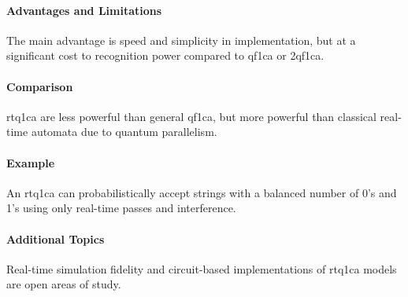 \paragraph{Advantages and Limitations}
The main advantage is speed and simplicity in implementation, but at a significant cost to recognition power compared to \gls{qf1ca} or \gls{2qf1ca}.

\paragraph{Comparison}
\gls{rtq1ca} are less powerful than general \gls{qf1ca}, but more powerful than classical real-time automata due to quantum parallelism.

\paragraph{Example}
An \gls{rtq1ca} can probabilistically accept strings with a balanced number of 0's and 1's using only real-time passes and interference.

\paragraph{Additional Topics}
Real-time simulation fidelity and circuit-based implementations of \gls{rtq1ca} models are open areas of study.
